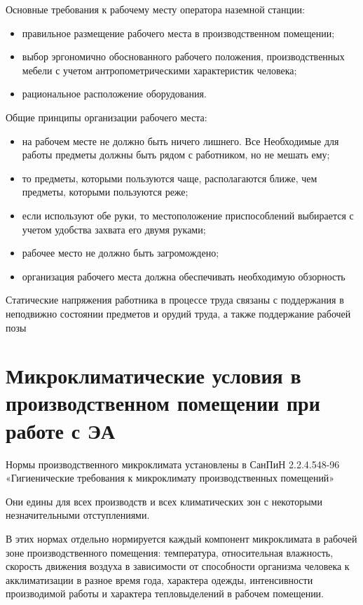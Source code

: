 \documentclass[a4paper,12pt]{report} %
\begin{document}
Основные требования к рабочему месту оператора наземной станции:

\begin{itemize}
\item правильное размещение рабочего места в производственном помещении; 
\item выбор эргономично обоснованного рабочего положения, производственных
  мебели с учетом антропометрическими характеристик человека; 
\item рациональное расположение оборудования. 
\end{itemize}

Общие принципы организации рабочего места:

\begin{itemize}
\item на рабочем месте не должно быть ничего лишнего. Все Необходимые для работы
  предметы должны быть рядом с работником, но не мешать ему; 
\item то предметы, которыми пользуются чаще, располагаются ближе, чем предметы,
  которыми пользуются реже; 
\item если используют обе руки, то местоположение приспособлений выбирается с
  учетом удобства захвата его двумя руками; 
\item рабочее место не должно быть загромождено; 
\item организация рабочего места должна обеспечивать необходимую обзорность 
\end{itemize}

Статические напряжения работника в процессе труда связаны с поддержания в
неподвижно состоянии предметов и орудий труда, а также поддержание рабочей позы 
\section{Микроклиматические условия в производственном помещении  при работе с
  ЭА} 
Нормы производственного микроклимата установлены в СанПиН 2.2.4.548-96
«Гигиенические требования к микроклимату производственных помещений» 

Они едины для всех производств и всех климатических зон с некоторыми
незначительными отступлениями. 

В этих нормах отдельно нормируется каждый компонент микроклимата в рабочей зоне
производственного помещения: температура, относительная влажность, скорость
движения воздуха в зависимости от способности организма человека к
акклиматизации в разное время года, характера одежды, интенсивности производимой
работы и характера тепловыделений в рабочем помещении. 
\end{document}
